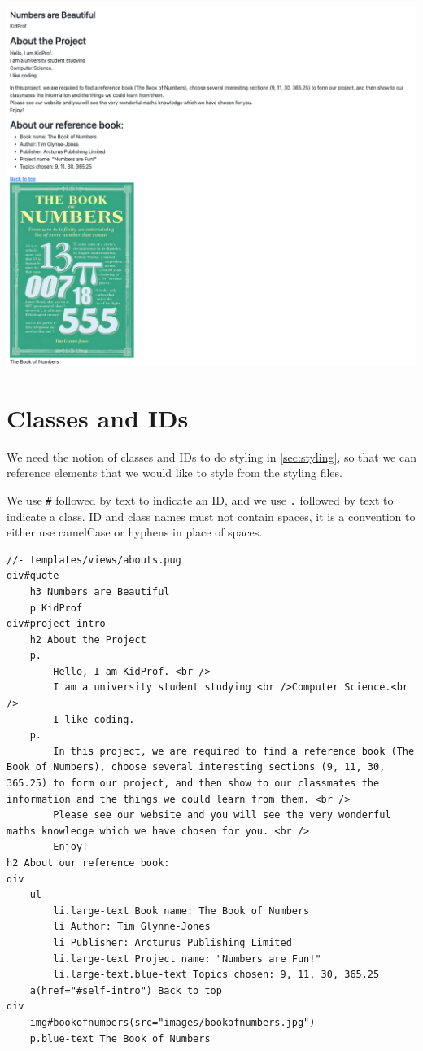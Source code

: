 \includegraphics[width=15cm]{images/ch5-finalproduct.png}

\section{Classes and IDs}
\label{sec:classesids}

We need the notion of classes and IDs to do styling in \cref{sec:styling}, so that we can reference elements that we would like to style from the styling files.

We use \texttt{\#} followed by text to indicate an ID, and we use \texttt{.} followed by text to indicate a class. ID and class names must not contain spaces, it is a convention to either use camelCase or hyphens in place of spaces.
\vspace{6mm}

\begin{lstlisting}[language=pug]
//- templates/views/abouts.pug
div#quote
    h3 Numbers are Beautiful
    p KidProf
div#project-intro
    h2 About the Project
    p.
	    Hello, I am KidProf. <br />
	    I am a university student studying <br />Computer Science.<br />
	    I like coding.
    p.
        In this project, we are required to find a reference book (The Book of Numbers), choose several interesting sections (9, 11, 30, 365.25) to form our project, and then show to our classmates the information and the things we could learn from them. <br />
        Please see our website and you will see the very wonderful maths knowledge which we have chosen for you. <br />
        Enjoy!
h2 About our reference book:
div
    ul
        li.large-text Book name: The Book of Numbers
        li Author: Tim Glynne-Jones
        li Publisher: Arcturus Publishing Limited
        li.large-text Project name: "Numbers are Fun!"
        li.large-text.blue-text Topics chosen: 9, 11, 30, 365.25
    a(href="#self-intro") Back to top
div
    img#bookofnumbers(src="images/bookofnumbers.jpg")
    p.blue-text The Book of Numbers
\end{lstlisting}

